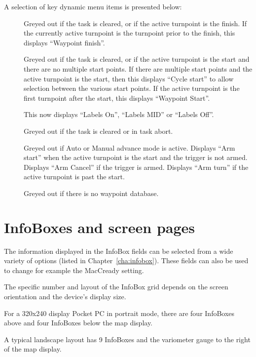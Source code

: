 A selection of key dynamic menu items is presented below:
\begin{description}
\item[]  
  Greyed out if the task is cleared, or if the active turnpoint is the
  finish. If the currently active turnpoint is the turnpoint prior to the 
  finish, this displays  ``Waypoint finish''.
\item[]  
  Greyed out if the task is cleared, or if the active turnpoint is the
  start and there are no multiple start points.  If there are multiple
  start points and the active turnpoint is the start, then this
  displays ``Cycle start'' to allow selection between the various
  start points.  If the active turnpoint is the first turnpoint after 
  the start, this displays ``Waypoint Start''.
\item[]  
  This now displays ``Labels On'', ``Labels MID'' or ``Labels Off''.
\item[]  
  Greyed out if the task is cleared or in task abort.
\item[]  
  Greyed out if Auto or Manual advance mode is active.  Displays ``Arm
  start'' when the active turnpoint is the start and the trigger is
  not armed.  Displays ``Arm Cancel'' if the trigger is armed.
  Displays ``Arm turn'' if the active turnpoint is past the start.
\item[]
  Greyed out if there is no waypoint database.
\end{description}

\section{InfoBoxes and screen pages}

The information displayed in the InfoBox fields can be selected from a
wide variety of options (listed in Chapter~\ref{cha:infobox}). These
fields can also be used to change for example the MacCready setting.

The specific number and layout of the InfoBox grid depends on the
screen orientation and the device's display size.  

For a 320x240 display
Pocket PC in portrait mode, there are four InfoBoxes above and four
InfoBoxes below the map display.  

A typical landscape layout has 9 InfoBoxes and the variometer gauge 
to the right of the map display. 
 
